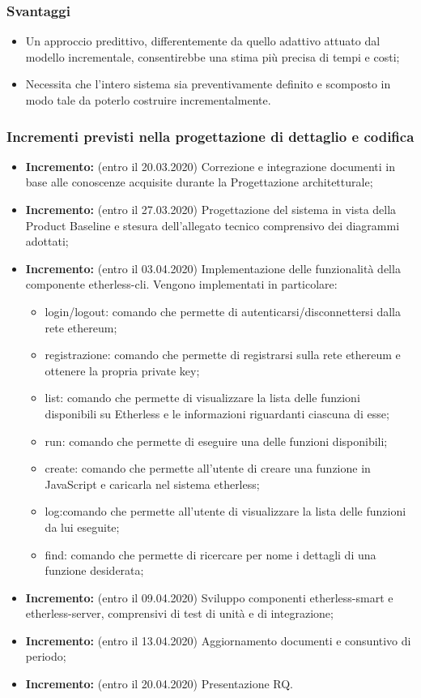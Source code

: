 \subsubsection{Svantaggi}
\begin{itemize}
	\item Un approccio predittivo, differentemente da quello adattivo attuato dal modello incrementale, consentirebbe una stima più precisa di tempi e costi;
	\item Necessita che l'intero sistema sia preventivamente definito e scomposto in modo tale da poterlo costruire incrementalmente.
\end{itemize}
\subsubsection{Incrementi previsti nella progettazione di dettaglio e codifica}
\begin{itemize}
	\item \textbf{ Incremento:} (entro il 20.03.2020) Correzione e integrazione documenti in base alle conoscenze acquisite durante la Progettazione architetturale;
	\item \textbf{ Incremento:} (entro il 27.03.2020) Progettazione del sistema in vista della Product Baseline e stesura dell'allegato tecnico comprensivo dei diagrammi adottati;
	\item \textbf{ Incremento:} (entro il 03.04.2020) Implementazione delle funzionalità della componente etherless-cli.
  Vengono implementati in particolare:
  \begin{itemize}
    \item login/logout: comando che permette di autenticarsi/disconnettersi dalla rete ethereum;
    \item registrazione: comando che permette di registrarsi sulla rete ethereum e ottenere la propria private key;
    \item list: comando che permette di visualizzare la lista delle funzioni disponibili su Etherless e le informazioni riguardanti ciascuna di esse;
    \item run: comando che permette di eseguire una delle funzioni disponibili;
    \item create: comando che permette all'utente di creare una funzione in JavaScript e caricarla nel sistema etherless;
    \item log:comando che permette all'utente di visualizzare la lista delle funzioni da lui eseguite;
    \item find: comando che permette di ricercare per nome i dettagli di una funzione desiderata;
  \end{itemize}
	\item \textbf{ Incremento:} (entro il 09.04.2020) Sviluppo componenti etherless-smart e etherless-server, comprensivi di test di unità e di integrazione;
	\item \textbf{ Incremento:} (entro il 13.04.2020) Aggiornamento documenti e consuntivo di periodo;
	\item \textbf{ Incremento:} (entro il 20.04.2020) Presentazione RQ.
\end{itemize}
